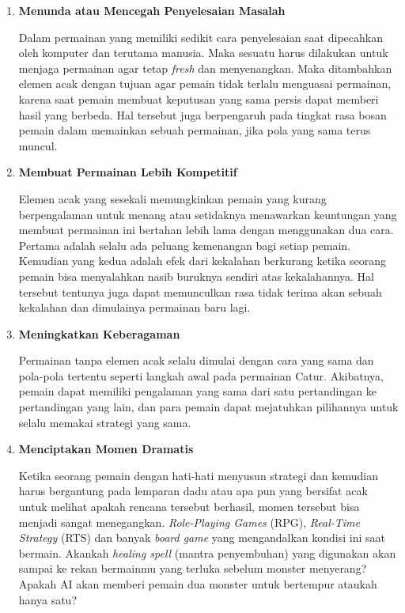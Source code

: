 \begin{enumerate}[label=\textbf{\alph*).}]

	\item \textbf{Menunda atau Mencegah Penyelesaian Masalah}

	Dalam permainan yang memiliki sedikit cara penyelesaian saat dipecahkan oleh komputer dan terutama manusia. Maka sesuatu harus dilakukan untuk menjaga permainan agar tetap \textit{fresh} dan menyenangkan. Maka ditambahkan elemen acak dengan tujuan agar pemain tidak terlalu menguasai permainan, karena saat pemain membuat keputusan yang sama persis dapat memberi hasil yang berbeda. Hal tersebut juga berpengaruh pada tingkat rasa bosan pemain dalam memainkan sebuah permainan, jika pola yang sama terus muncul.

	\item \textbf{Membuat Permainan Lebih Kompetitif}

	Elemen acak yang sesekali memungkinkan pemain yang kurang berpengalaman untuk menang atau setidaknya menawarkan keuntungan yang membuat permainan ini bertahan lebih lama dengan menggunakan dua cara. Pertama adalah selalu ada peluang kemenangan bagi setiap pemain. Kemudian yang kedua adalah efek dari kekalahan berkurang ketika seorang pemain bisa menyalahkan nasib buruknya sendiri atas kekalahannya. Hal tersebut tentunya juga dapat memunculkan rasa tidak terima akan sebuah kekalahan dan dimulainya permainan baru lagi.
	
	\item \textbf{Meningkatkan Keberagaman}
	
	Permainan tanpa elemen acak selalu dimulai dengan cara yang sama dan pola-pola tertentu seperti langkah awal pada permainan Catur. Akibatnya, pemain dapat memiliki pengalaman yang sama dari satu pertandingan ke pertandingan yang lain, dan para pemain dapat mejatuhkan pilihannya untuk selalu memakai strategi yang sama.

	\item \textbf{Menciptakan Momen Dramatis}
	
	Ketika seorang pemain dengan hati-hati menyusun strategi dan kemudian harus bergantung pada lemparan dadu atau apa pun yang bersifat acak untuk melihat apakah rencana tersebut berhasil, momen tersebut bisa menjadi sangat menegangkan. \textit{Role-Playing Games} (RPG), \textit{Real-Time Strategy} (RTS) dan banyak \textit{board game} yang mengandalkan kondisi ini saat bermain. Akankah \textit{healing spell} (mantra penyembuhan) yang digunakan akan sampai ke rekan bermainmu yang terluka sebelum monster menyerang? Apakah AI akan memberi pemain dua monster untuk bertempur ataukah hanya satu?


\end{enumerate}
